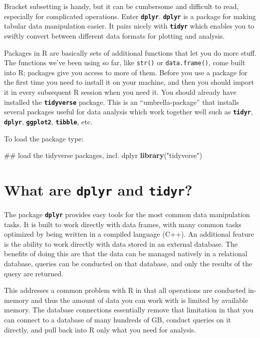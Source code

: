 \documentclass[]{book}
\newenvironment{Shaded}{\begin{snugshade}}{\end{snugshade}}
\newcommand{\KeywordTok}[1]{\textcolor[rgb]{0.13,0.29,0.53}{\textbf{#1}}}
\newcommand{\StringTok}[1]{\textcolor[rgb]{0.31,0.60,0.02}{#1}}
\newcommand{\NormalTok}[1]{#1}
\begin{document}
Bracket subsetting is handy, but it can be cumbersome and difficult to
read, especially for complicated operations. Enter
\textbf{\texttt{dplyr}}. \textbf{\texttt{dplyr}} is a package for making
tabular data manipulation easier. It pairs nicely with
\textbf{\texttt{tidyr}} which enables you to swiftly convert between
different data formats for plotting and analysis.

Packages in R are basically sets of additional functions that let you do
more stuff. The functions we've been using so far, like \texttt{str()}
or \texttt{data.frame()}, come built into R; packages give you access to
more of them. Before you use a package for the first time you need to
install it on your machine, and then you should import it in every
subsequent R session when you need it. You should already have installed
the \textbf{\texttt{tidyverse}} package. This is an ``umbrella-package''
that installs several packages useful for data analysis which work
together well such as \textbf{\texttt{tidyr}}, \textbf{\texttt{dplyr}},
\textbf{\texttt{ggplot2}}, \textbf{\texttt{tibble}}, etc.

To load the package type:

\begin{Shaded}
\begin{Highlighting}[]
\NormalTok{## load the tidyverse packages, incl. dplyr}
\KeywordTok{library}\NormalTok{(}\StringTok{"tidyverse"}\NormalTok{)}
\end{Highlighting}
\end{Shaded}

\section{\texorpdfstring{What are \textbf{\texttt{dplyr}} and
\textbf{\texttt{tidyr}}?}{What are dplyr and tidyr?}}\label{what-are-dplyr-and-tidyr}

The package \textbf{\texttt{dplyr}} provides easy tools for the most
common data manipulation tasks. It is built to work directly with data
frames, with many common tasks optimized by being written in a compiled
language (C++). An additional feature is the ability to work directly
with data stored in an external database. The benefits of doing this are
that the data can be managed natively in a relational database, queries
can be conducted on that database, and only the results of the query are
returned.

This addresses a common problem with R in that all operations are
conducted in-memory and thus the amount of data you can work with is
limited by available memory. The database connections essentially remove
that limitation in that you can connect to a database of many hundreds
of GB, conduct queries on it directly, and pull back into R only what
you need for analysis.
\end{document}
